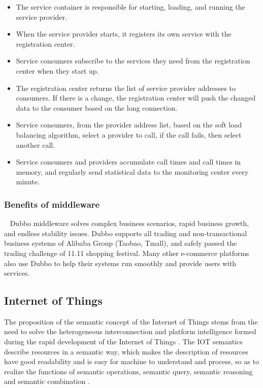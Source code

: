 \documentclass[conference]{IEEEtran}
\begin{document}
\begin{itemize}
\item The service container is responsible for starting, loading, and running the service provider.
\item When the service provider starts, it registers its own service with the registration center.
\item Service consumers subscribe to the services they need from the registration center when they start up.
\item The registration center returns the list of service provider addresses to consumers. If there is a change, the registration center will push the changed data to the consumer based on the long connection.
\item Service consumers, from the provider address list, based on the soft load balancing algorithm, select a provider to call, if the call fails, then select another call.
\item Service consumers and providers accumulate call times and call times in memory, and regularly send statistical data to the monitoring center every minute.
\end{itemize}


\subsubsection{Benefits of middleware}
\
\newline
\indent
Dubbo middleware solves complex business scenarios, rapid business growth, and endless stability issues. Dubbo supports all trading and non-transactional business systems of Alibaba Group (Taobao, Tmall), and safely passed the trading challenge of 11.11 shopping festival.
Many other e-commerce platforms also use Dubbo to help their systems run smoothly and provide users with services.

\subsection{Internet of Things}
The proposition of the semantic concept of the Internet of Things stems from the need to solve the heterogeneous interconnection and platform intelligence formed during the rapid development of the Internet of Things \cite{b4}. The IOT semantics describe resources in a semantic way, which makes the description of resources have good readability and is easy for machine to understand and process, so as to realize the functions of semantic operations, semantic query, semantic reasoning and semantic combination \cite{b5}.
\end{document}
